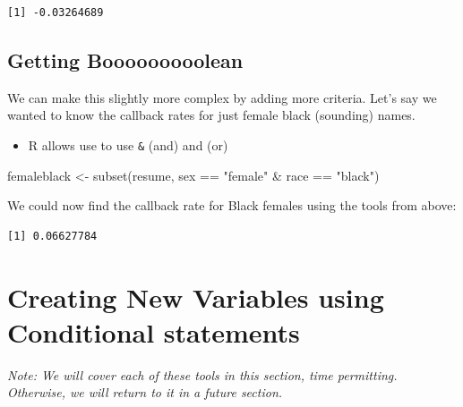 \documentclass[
  letterpaper,
  DIV=11,
  numbers=noendperiod]{scrreprt}
\newenvironment{Shaded}{\begin{snugshade}}{\end{snugshade}}
\newcommand{\FunctionTok}[1]{\textcolor[rgb]{0.28,0.35,0.67}{#1}}
\newcommand{\NormalTok}[1]{\textcolor[rgb]{0.00,0.23,0.31}{#1}}
\newcommand{\OtherTok}[1]{\textcolor[rgb]{0.00,0.23,0.31}{#1}}
\newcommand{\SpecialCharTok}[1]{\textcolor[rgb]{0.37,0.37,0.37}{#1}}
\newcommand{\StringTok}[1]{\textcolor[rgb]{0.13,0.47,0.30}{#1}}
\providecommand{\tightlist}{%
  \setlength{\itemsep}{0pt}\setlength{\parskip}{0pt}}\usepackage{longtable,booktabs,array}
\begin{document}
\begin{verbatim}
[1] -0.03264689
\end{verbatim}

\hypertarget{getting-booooooooolean}{%
\subsection{Getting Booooooooolean}\label{getting-booooooooolean}}

We can make this slightly more complex by adding more criteria. Let's
say we wanted to know the callback rates for just female black
(sounding) names.

\begin{itemize}
\tightlist
\item
  R allows use to use \texttt{\&} (and) and \texttt{\textbar{}} (or)
\end{itemize}

\begin{Shaded}
\begin{Highlighting}[]
\NormalTok{femaleblack }\OtherTok{\textless{}{-}} \FunctionTok{subset}\NormalTok{(resume, sex }\SpecialCharTok{==} \StringTok{"female"} \SpecialCharTok{\&}\NormalTok{ race }\SpecialCharTok{==} \StringTok{"black"}\NormalTok{)}
\end{Highlighting}
\end{Shaded}

We could now find the callback rate for Black females using the tools
from above:

\begin{Shaded}
\end{Shaded}

\begin{verbatim}
[1] 0.06627784
\end{verbatim}

\hypertarget{creating-new-variables-using-conditional-statements}{%
\section{Creating New Variables using Conditional
statements}\label{creating-new-variables-using-conditional-statements}}

\emph{Note: We will cover each of these tools in this section, time
permitting. Otherwise, we will return to it in a future section.}
\end{document}
